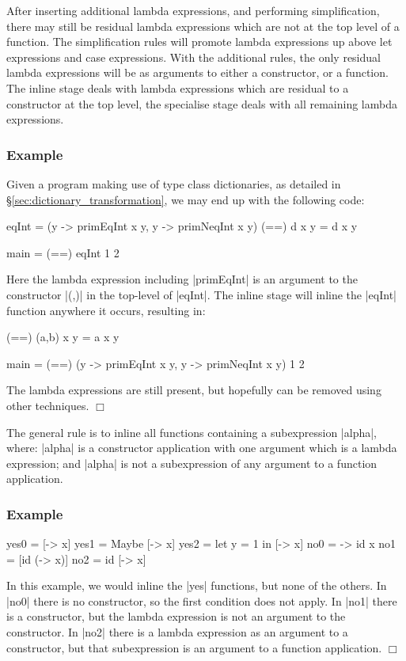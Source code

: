 \documentclass[preprint]{sigplanconf}
\newcounter{exmp}
\newenvironment{exampleany}[1]
    {\subsubsection*{Example #1}}
    {\hfill$\Box$}
\newenvironment{example}
    {\refstepcounter{exmp}
     \begin{exampleany}{\arabic{exmp}}}
    {\end{exampleany}}
\begin{document}
After inserting additional lambda expressions, and performing simplification, there may still be residual lambda expressions which are not at the top level of a function. The simplification rules will promote lambda expressions up above let expressions and case expressions. With the additional rules, the only residual lambda expressions will be as arguments to either a constructor, or a function. The inline stage deals with lambda expressions which are residual to a constructor at the top level, the specialise stage deals with all remaining lambda expressions.

\begin{example}
Given a program making use of type class dictionaries, as detailed in \S\ref{sec:dictionary_transformation}, we may end up with the following code:

\begin{code}
eqInt = (\x y -> primEqInt x y, \x y -> primNeqInt x y)
(==) d x y = d x y

main = (==) eqInt 1 2
\end{code}

Here the lambda expression including |primEqInt| is an argument to the constructor |(,)| in the top-level of |eqInt|. The inline stage will inline the |eqInt| function anywhere it occurs, resulting in:

\begin{code}
(==) (a,b) x y = a x y

main = (==) (\x y -> primEqInt x y, \x y -> primNeqInt x y) 1 2
\end{code}

The lambda expressions are still present, but hopefully can be removed using other techniques.
\end{example}

The general rule is to inline all functions containing a subexpression |alpha|, where: |alpha| is a constructor application with one argument which is a lambda expression; and |alpha| is not a subexpression of any argument to a function application.

\begin{example}
\begin{code}
yes0 = [\x -> x]
yes1 = Maybe [\x -> x]
yes2 = let y = 1 in [\x -> x]
no0 = \x -> id x
no1 = [id (\x -> x)]
no2 = id [\x -> x]
\end{code}

In this example, we would inline the |yes| functions, but none of the others. In |no0| there is no constructor, so the first condition does not apply. In |no1| there is a constructor, but the lambda expression is not an argument to the constructor. In |no2| there is a lambda expression as an argument to a constructor, but that subexpression is an argument to a function application.
\end{example}
\end{document}
